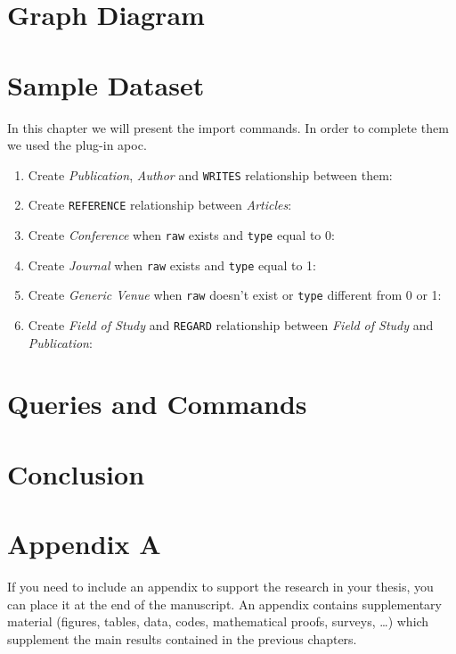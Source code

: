 \documentclass{Configuration_Files/PoliMi3i_thesis}
\begin{document}
\chapter{Graph Diagram}

\chapter{Sample Dataset}
In this chapter we will present the import commands. In order to complete them we used the plug-in apoc.

\begin{enumerate}
    \item Create \emph{Publication}, \emph{Author} and \verb |WRITES| relationship between them: 
    \item Create \verb |REFERENCE| relationship between \emph{Articles}: 
    \item Create \emph{Conference} when \verb |raw| exists and \verb |type| equal to 0: 
    \item Create \emph{Journal} when \verb |raw| exists and \verb |type| equal to 1: 
    \item Create \emph{Generic Venue} when \verb |raw| doesn't exist or \verb |type| different from 0 or 1: 
    \item Create \emph{Field of Study} and \verb |REGARD| relationship between \emph{Field of Study} and \emph{Publication}: 
\end{enumerate}

\chapter{Queries and Commands}

\chapter{Conclusion}


\cleardoublepage
{} %
\appendix
\chapter{Appendix A}
If you need to include an appendix to support the research in your thesis, you can place it at the end of the manuscript.
An appendix contains supplementary material (figures, tables, data, codes, mathematical proofs, surveys, \dots)
which supplement the main results contained in the previous chapters.


\listoffigures

\listoftables

\cleardoublepage
\end{document}
